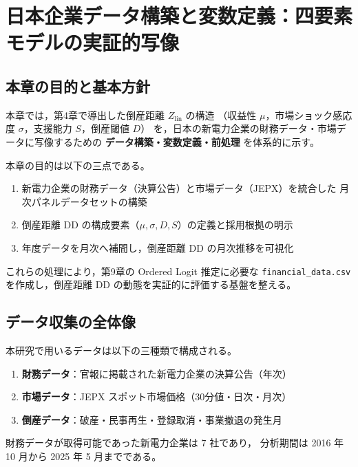 \chapter{日本企業データ構築と変数定義：四要素モデルの実証的写像}
\label{chap:data_construction}

\section{本章の目的と基本方針}

本章では，第4章で導出した倒産距離 $Z_{\text{lin}}$ の構造
（収益性 $\mu$，市場ショック感応度 $\sigma$，支援能力 $S$，倒産閾値 $D$）
を，日本の新電力企業の財務データ・市場データに写像するための
\textbf{データ構築・変数定義・前処理} を体系的に示す。

本章の目的は以下の三点である。

\begin{enumerate}
  \item 新電力企業の財務データ（決算公告）と市場データ（JEPX）を統合した
        月次パネルデータセットの構築
  \item 倒産距離 DD の構成要素（$\mu,\sigma,D,S$）の定義と採用根拠の明示
  \item 年度データを月次へ補間し，倒産距離 DD の月次推移を可視化
\end{enumerate}

これらの処理により，第9章の Ordered Logit 推定に必要な
\texttt{financial\_data.csv} を作成し，倒産距離 DD の動態を実証的に評価する基盤を整える。


\section{データ収集の全体像}

本研究で用いるデータは以下の三種類で構成される。

\begin{enumerate}
\item \textbf{財務データ}：官報に掲載された新電力企業の決算公告（年次）
\item \textbf{市場データ}：JEPX スポット市場価格（30分値・日次・月次）
\item \textbf{倒産データ}：破産・民事再生・登録取消・事業撤退の発生月
\end{enumerate}

財務データが取得可能であった新電力企業は 7 社であり，
分析期間は 2016 年 10 月から 2025 年 5 月までである。

